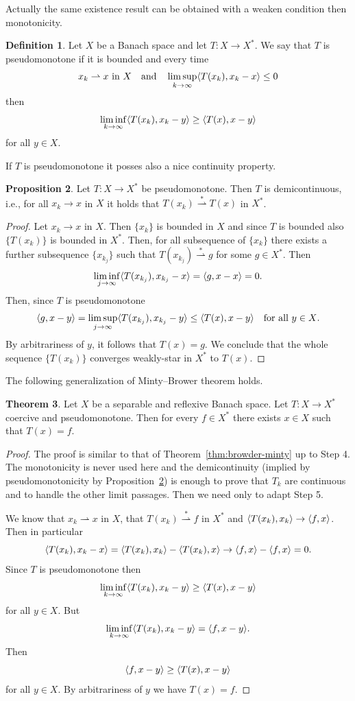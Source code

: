 \documentclass[a4paper,10pt,oneside]{amsbook}
\numberwithin{section}{chapter}
\numberwithin{equation}{chapter}
\theoremstyle{definition}
\newtheorem{prop}{Proposition}[chapter]
\newtheorem{defi}[prop]{Definition}
\newtheorem{thm}[prop]{Theorem}
\DeclarePairedDelimiter{\dual}{\langle}{\rangle}
\begin{document}
Actually the same existence result can be obtained with a weaken condition then monotonicity.
\begin{defi}
Let $X$ be a Banach space and let $T\colon X\to X^*$. We say that $T$ is pseudomonotone if it is bounded and every time
\[
\text{$x_k\rightharpoonup x$ in $X$}\quad\text{and}\quad\limsup_{k\to\infty}\dual{T(x_k),x_k-x}\le0
\]
then
\[
\liminf_{k\to\infty}\dual{T(x_k),x_k-y}\ge\dual{T(x),x-y}
\]
for all $y\in X$.
\end{defi}
If $T$ is pseudomonotone it posses also a nice continuity property.
\begin{prop}
\label{prop:pseudomonotone-demicontinuous}
Let $T\colon X\to X^*$ be pseudomonotone. Then $T$ is demicontinuous, i.e., for all $x_k\to x$ in $X$ it holds that $T(x_k)\overset{*}{\rightharpoonup}T(x)$ in $X^*$.
\end{prop}
\begin{proof}
Let $x_k\to x$ in $X$. Then $\{x_k\}$ is bounded in $X$ and since $T$ is bounded also $\{T(x_k)\}$ is bounded in $X^*$. Then, for all subsequence of $\{x_k\}$ there exists a further subsequence $\{x_{k_j}\}$ such that $T(x_{k_j})\overset{*}{\rightharpoonup}g$ for some $g\in X^*$. Then
\[
\liminf_{j\to\infty}\dual{T(x_{k_j}),x_{k_j}-x}=\dual{g,x-x}=0.
\]
Then, since $T$ is pseudomonotone
\[
\dual{g,x-y}=\limsup_{j\to\infty}\dual{T(x_{k_j}),x_{k_j}-y}\le\dual{T(x),x-y}\quad\text{for all $y\in X$}.
\]
By arbitrariness of $y$, it follows that $T(x)=g$. We conclude that the whole sequence $\{T(x_k)\}$ converges weakly-star in $X^*$ to $T(x)$.
\end{proof}
The following generalization of Minty--Brower theorem holds.
\begin{thm}
\label{thm:browder-minty-generalized}
Let $X$ be a separable and reflexive Banach space. Let $T\colon X\to X^*$ coercive and pseudomonotone. Then for every $f\in X^*$ there exists $x\in X$ such that $T(x)=f$.
\end{thm}
\begin{proof}
The proof is similar to that of Theorem~\ref{thm:browder-minty} up to Step 4. The monotonicity is never used here and the demicontinuity (implied by pseudomonotonicity by Proposition~\ref{prop:pseudomonotone-demicontinuous}) is enough to prove that $T_k$ are continuous and to handle the other limit passages. Then we need only to adapt Step 5.

We know that $x_k\rightharpoonup x$ in $X$, that $T(x_k)\overset{*}{\rightharpoonup}f$ in $X^*$ and $\dual{T(x_k),x_k}\to\dual{f,x}$. Then in particular
\[
\dual{T(x_k),x_k-x}=\dual{T(x_k),x_k}-\dual{T(x_k),x}\to\dual{f,x}-\dual{f,x}=0.
\]
Since $T$ is pseudomonotone then
\[
\liminf_{k\to\infty}\dual{T(x_k),x_k-y}\ge\dual{T(x),x-y}
\]
for all $y\in X$. But
\[
\liminf_{k\to\infty}\dual{T(x_k),x_k-y}=\dual{f,x-y}.
\]
Then
\[
\dual{f,x-y}\ge\dual{T(x),x-y}
\]
for all $y\in X$. By arbitrariness of $y$ we have $T(x)=f$.
\end{proof}
\end{document}
